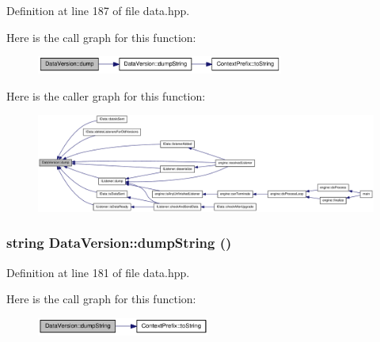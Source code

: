 Definition at line 187 of file data.hpp.

Here is the call graph for this function:\nopagebreak
\begin{figure}[H]
\begin{center}
\leavevmode
\includegraphics[width=230pt]{struct_data_version_a03b5b85b2c309989eb96c2248b0dedfa_cgraph}
\end{center}
\end{figure}


Here is the caller graph for this function:\nopagebreak
\begin{figure}[H]
\begin{center}
\leavevmode
\includegraphics[width=420pt]{struct_data_version_a03b5b85b2c309989eb96c2248b0dedfa_icgraph}
\end{center}
\end{figure}
\hypertarget{struct_data_version_a09ef74f4b532a991d2a05982d012d524}{
\subsubsection[{dumpString}]{\setlength{\rightskip}{0pt plus 5cm}string DataVersion::dumpString ()}}
\label{struct_data_version_a09ef74f4b532a991d2a05982d012d524}


Definition at line 181 of file data.hpp.

Here is the call graph for this function:\nopagebreak
\begin{figure}[H]
\begin{center}
\leavevmode
\includegraphics[width=161pt]{struct_data_version_a09ef74f4b532a991d2a05982d012d524_cgraph}
\end{center}
\end{figure}


